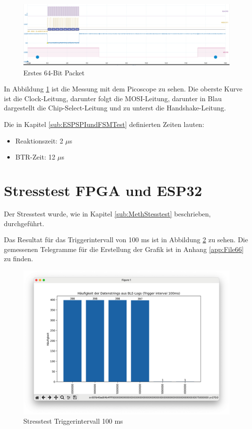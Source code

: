 \begin{figure}
    \centering
    \includegraphics[width=\linewidth]{Figures/Chap4/Verbindungstest_SPI/VerbindungstestZeiten.png}
    \caption{Erstes 64-Bit Packet}
    \label{fig:VerbindungstestZeiten}
\end{figure}

In Abbildung \ref{fig:VerbindungstestZeiten} ist die Messung mit dem Picoscope zu sehen. Die oberste Kurve ist die Clock-Leitung, darunter folgt die MOSI-Leitung, darunter in Blau dargestellt die Chip-Select-Leitung und zu unterst die Handshake-Leitung.

Die in Kapitel \ref{sub:ESPSPIundFSMTest} definierten Zeiten lauten:
\begin{itemize}
    \item Reaktionszeit: 2 $\mu$s
    \item BTR-Zeit: 12 $\mu$s
\end{itemize}


\section{Stresstest FPGA und ESP32}
\label{sec:ResStresstest}

Der Stresstest wurde, wie in Kapitel \ref{sub:MethStesstest} beschrieben, durchgeführt.

Das Resultat für das Triggerintervall von 100 ms ist in Abbildung \ref{fig:Stress100} zu sehen. Die gemessenen Telegramme für die Erstellung der Grafik ist in Anhang \ref{app:File66} zu finden.

\begin{figure}[H]
    \centering
    \includegraphics[width=0.9\linewidth]{Figures/Chap4/Stesstest/Stress_100.png}
    \caption{Stresstest Triggerintervall 100 ms}
    \label{fig:Stress100}
\end{figure}

